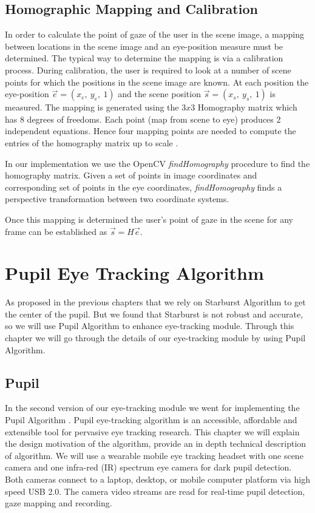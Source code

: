 \documentclass[12pt,fleqn]{book} %
\begin{document}
\section{Homographic Mapping and Calibration}
In order to calculate the point of gaze of the user in the scene image, a mapping between locations in the scene image and an eye-position measure must be determined. The typical way to determine the mapping is via a calibration process. During calibration, the user is required to look at a number of scene points for which the positions in the scene image are known. At each position the eye-position $\vec{e} = (x_{e} ,\: y_{e},\: 1)$ and the scene position $\vec{s} = (x_{s},\: y_{s},\: 1)$ is measured. The mapping is generated using the $3x3$ Homography matrix which has 8 degrees of freedoms. Each point (map from scene to eye) produces 2 independent equations. Hence four mapping points are needed to compute the entries of the homography matrix up to scale \cite{heuristic}. \bigskip

In our implementation we use the OpenCV \textit{findHomography} procedure to find the homography matrix. Given a set of points in image coordinates and corresponding set of points in the eye coordinates, \textit{findHomography} finds a perspective transformation between two coordinate systems. \bigskip

Once this mapping is determined the user’s point of gaze in the scene for any frame can be established
as $\vec{s} = H \vec{e}$.


\chapter{Pupil Eye Tracking Algorithm}
As proposed in the previous chapters that we rely on Starburst \cite{starburst} Algorithm to get the center of the pupil. But we found that Starburst is not robust and accurate, so we will use Pupil Algorithm to enhance eye-tracking module. Through this chapter we will go through the details of our eye-tracking module by using Pupil Algorithm.

\section{Pupil}
In the second version of our eye-tracking module we went for implementing the Pupil Algorithm \cite{pupil}. Pupil eye-tracking algorithm is an accessible, affordable and extensible tool for pervasive eye tracking research. This chapter we will explain the design motivation of the algorithm, provide an in depth technical description of algorithm. We will use a wearable mobile eye tracking headset with one 
scene camera and one infra-red (IR) spectrum eye camera for dark pupil detection. Both cameras connect to a laptop, desktop, or mobile computer platform via high speed USB 2.0. The camera video streams are read for real-time pupil detection, gaze mapping and recording.  
\end{document}
